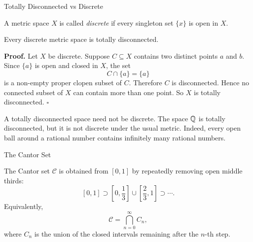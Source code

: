 \documentclass[12pt, a4paper]{article}
\begin{document}
\clearpage

\begin{heading}
    Totally Disconnected vs Discrete
\end{heading}

\vspace{10pt}

\begin{definition}
A metric space $X$ is called \textit{discrete} if every singleton set $\{x\}$ is open in $X$.
\end{definition}

\vspace{30pt}

\begin{theorem}
Every discrete metric space is totally disconnected.
\end{theorem}

\textbf{Proof.}
Let $X$ be discrete. Suppose $C\subseteq X$ contains two distinct points $a$ and $b$. Since $\{a\}$ is open and closed in $X$, the set
\[
    C\cap\{a\}=\{a\}
\]
is a non-empty proper clopen subset of $C$. Therefore $C$ is disconnected. Hence no connected subset of $X$ can contain more than one point. So $X$ is totally disconnected. \hfill $\square$

\vfill

\begin{problem}
A totally disconnected space need not be discrete. The space $\mathbb{Q}$ is totally disconnected, but it is not discrete under the usual metric. Indeed, every open ball around a rational number contains infinitely many rational numbers.
\end{problem}

\clearpage

\begin{heading}
    The Cantor Set
\end{heading}

\vspace{10pt}

\begin{definition}
The Cantor set $\mathcal{C}$ is obtained from $[0,1]$ by repeatedly removing open middle thirds:
\[
[0,1]
\supset
\left[0,\frac13\right]\cup\left[\frac23,1\right]
\supset \cdots.
\]
Equivalently,
\[
    \mathcal{C}=\bigcap_{n=0}^{\infty} C_n,
\]
where $C_n$ is the union of the closed intervals remaining after the $n$-th step.
\end{definition}
\end{document}

